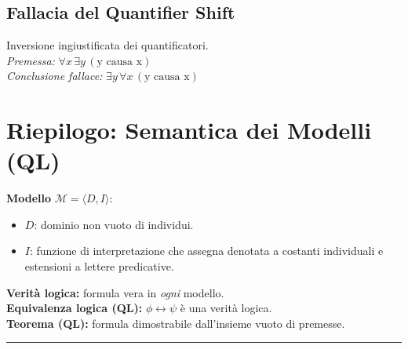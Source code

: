 \documentclass[10pt,a4paper]{article}
\newcommand{\liff}{\leftrightarrow}
\begin{document}
\subsection{Fallacia del Quantifier Shift}

\begin{attenzione}
Inversione ingiustificata dei quantificatori.\\
\textit{Premessa:} $\forall x\,\exists y\,(\text{y causa x})$\\
\textit{Conclusione fallace:} $\exists y\,\forall x\,(\text{y causa x})$
\end{attenzione}


\newpage
\section{Riepilogo: Semantica dei Modelli (QL)}

\begin{definizione}
\textbf{Modello} $\mathcal{M} = \langle D, I \rangle$:
\begin{itemize}[leftmargin=*, itemsep=1pt, topsep=0pt]
  \item $D$: dominio non vuoto di individui.
  \item $I$: funzione di interpretazione che assegna denotata a
    costanti individuali e estensioni a lettere predicative.
\end{itemize}
\textbf{Verità logica:} formula vera in \emph{ogni} modello.\\
\textbf{Equivalenza logica (QL):} $\phi \liff \psi$ è una verità logica.\\
\textbf{Teorema (QL):} formula dimostrabile dall'insieme vuoto di premesse.
\end{definizione}



\vspace{0.5em}
\hrule
\vspace{0.3em}
\end{document}
